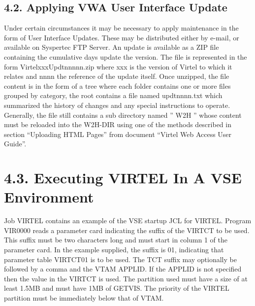 \documentclass[letterpaper,10pt,english]{sphinxmanual}
\begin{document}
\subsection{4.2. Applying VWA User Interface Update}
\label{\detokenize{Installation_Guide:id2}}\label{\detokenize{Installation_Guide:v457ig-bookmark02}}
Under certain circumstances it may be necessary to apply maintenance in the form of User Interface Updates. These may be distributed either by e-mail, or available on Syspertec FTP Server.
An update is available as a ZIP file containing the cumulative days update the version. The file is represented in the form VirtelxxxUpdtnnnnn.zip where xxx is the version of Virtel to which it relates and nnnn the reference of the update itself. Once unzipped, the file content is in the form of a tree where each folder contains one or more files grouped by category, the root contains a file named updtnnnn.txt which summarized the history of changes and any special instructions to operate. Generally, the file still contains a sub directory named ” W2H ” whose content must be reloaded into the W2H-DIR
using one of the methods described in section “Uploading HTML Pages” from document “Virtel Web Access User Guide”.


\section{4.3. Executing VIRTEL In A VSE Environment}
\label{\detokenize{Installation_Guide:executing-virtel-in-a-vse-environment}}
Job VIRTEL contains an example of the VSE startup JCL for VIRTEL. Program VIR0000 reads a parameter card indicating the suffix of the VIRTCT to be used. This suffix must be two characters long and must start in column 1 of the parameter card. In the example supplied, the suffix is 01, indicating that parameter table VIRTCT01 is to be used. The TCT suffix may optionally be followed by a comma and the VTAM APPLID. If the APPLID is not specified then the value in the VIRTCT is used. The partition used must have a size of at least 1.5MB and must have 1MB of GETVIS. The priority of the VIRTEL partition must be immediately below that of VTAM.
\end{document}
